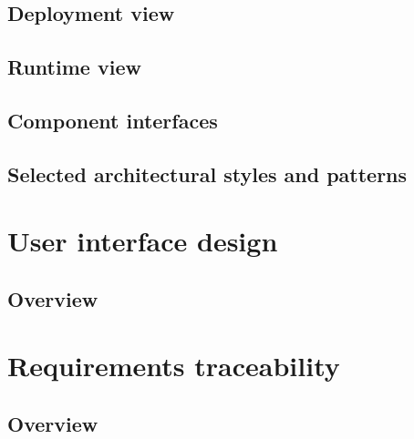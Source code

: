 \documentclass[10pt,english, openany]{book}
\begin{document}


\pagebreak

\section{Deployment view}



\pagebreak

\section{Runtime view}



\section{Component interfaces}



\section{Selected architectural styles and patterns}




\chapter{User interface design}

\section{Overview}



\chapter{Requirements traceability}

\section{Overview}


\end{document}
